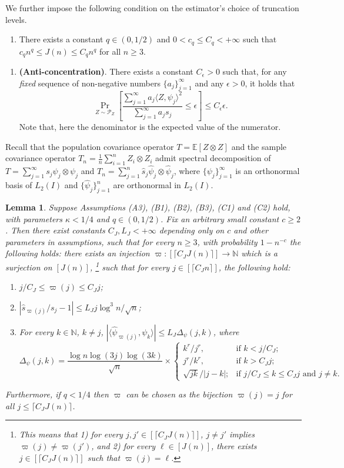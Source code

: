 \documentclass[11pt,a4paper]{article}
\renewcommand{\hat}{\widehat}
\theoremstyle{definition}
\theoremstyle{plain}
\newtheorem{lemma}{Lemma}[section]
\theoremstyle{remark}
\begin{document}
We further impose the following condition on the estimator's choice of truncation levels.
\begin{enumerate}
\item[(C2)] There exists a constant $q\in(0,1/2)$ and $0<c_q\leq C_q<+\infty$ such that $c_q n^q\leq J(n)\leq C_q n^q$ for all $n\geq 3$.
\end{enumerate}

{\color{orange}
\begin{enumerate}
\item[(C3)] \textbf{(Anti-concentration)}. There exists a constant $C_\epsilon>0$ such that, for any \emph{fixed} sequence of non-negative numbers $\{a_j\}_{j=1}^{\infty}$ and any $\epsilon>0$, it holds that
$$
\Pr_{Z\sim \mathcal P_Z}\left[\frac{\sum_{j=1}^{\infty} a_j\langle Z,\psi_j\rangle^2}{\sum_{j=1}^{\infty} a_js_j} \leq \epsilon\right] \leq C_\epsilon \epsilon.
$$
Note that, here the denominator is the expected value of the numerator.
\end{enumerate}
}

Recall that the population covariance operator $T=\mathbb E[Z\otimes Z]$ and the sample covariance operator $T_n=\frac{1}{n}\sum_{i=1}^nZ_i\otimes Z_i$ admit spectral decomposition of
$T=\sum_{j=1}^{\infty}s_j\psi_j\otimes\psi_j$ and $T_n=\sum_{j=1}^n\hat s_j\hat\psi_j\otimes\hat\psi_j$, where $\{\psi_j\}_{j=1}^{\infty}$ is an orthonormal basis of $L_2(I)$ and $\{\hat\psi_j\}_{j=1}^n$ are orthonormal in $L_2(I)$.
\begin{lemma}
Suppose Assumptions (A3), (B1), (B2), (B3), (C1) and (C2) hold, with parameters $\kappa<1/4$ and $q\in(0,1/2)$.
Fix an arbitrary small constant $c\geq 2$.
Then there exist constants $C_J,L_J<+\infty$ depending only on $c$ and other parameters in assumptions, such that for every $n\geq 3$, 
with probability $1-n^{-c}$ the following holds: there exists an injection $\varpi:[\lceil C_J J(n)\rceil]\to \mathbb N$ which is a surjection on $[J(n)]$,
\footnote{This means that 1) for every $j,j'\in[\lceil C_JJ(n)\rceil]$, $j\neq j'$ implies $\varpi(j)\neq\varpi(j')$, and 2) for every $\ell\in[J(n)]$, there exists $j\in[\lceil C_JJ(n)\rceil]$ such that $\varpi(j)=\ell$.}
 such that for every $j\in[\lceil C_J n\rceil]$, the following hold:
\begin{enumerate}
\item $j/C_J\leq \varpi(j)\leq C_J j$;
\item $|\hat s_{\varpi(j)}/s_j-1|\leq L_J j\log^3 n/\sqrt{n}$;
\item For every $k\in\mathbb N$, $k\neq j$, $|\langle\hat\psi_{\varpi(j)},\psi_k\rangle|\leq L_J\Delta_\psi(j,k)$, where
$$
\Delta_\psi(j,k) = \frac{\log n\log(3j)\log(3k)}{\sqrt{n}}\times \left\{\begin{array}{ll} k^r/j^r,& \text{if }k< j/C_J;\\ j^r/k^r,& \text{if } k> C_Jj;\\ \sqrt{jk}/|j-k|;& \text{if $j/C_J \leq k \leq C_Jj$ and $j\neq k$.}\end{array}\right.
$$
\end{enumerate}
Furthermore, if $q<1/4$ then $\varpi$ can be chosen as the bijection $\varpi(j)=j$ for all $j\leq \lceil C_JJ(n)\rceil$.
\label{lem:stability}
\end{lemma}
\end{document}
